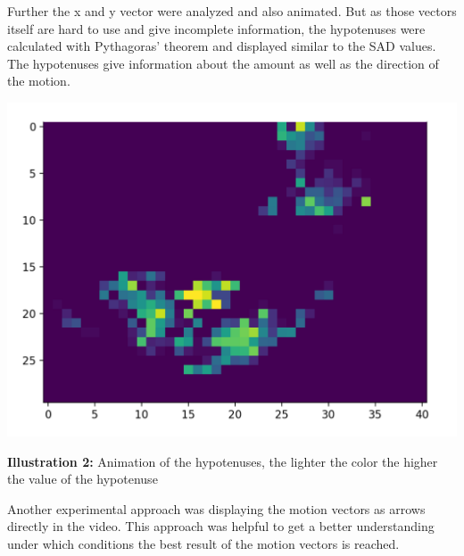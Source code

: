 \documentclass[12pt, a4paper]{report}
\begin{document}
\bigskip
 
Further the x and y vector were analyzed and also animated. But as those vectors itself are hard to use and give incomplete information, the hypotenuses were calculated with Pythagoras' theorem and displayed similar to the SAD values. The hypotenuses give information about the amount as well as the direction of the motion.
 
 \bigskip

\noindent
\begin{center}
\includegraphics[scale=0.6]{Images/animation_hypotenuse.png}

{\bf Illustration 2:}  Animation of the hypotenuses, the lighter the color the higher the value of the hypotenuse
\end{center}

\bigskip

Another experimental approach was displaying the motion vectors as arrows directly in the video. This approach was helpful to get a better understanding under which conditions the best result of the motion vectors is reached.
\pagebreak
\end{document}
